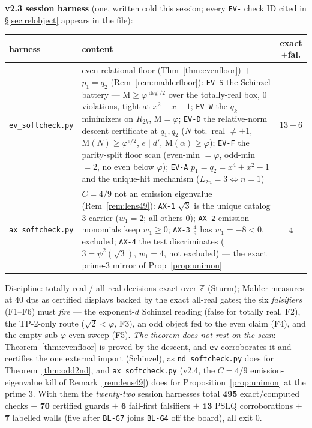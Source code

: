 \documentclass[11pt]{article}
\newcommand{\hx}[1]{\textcolor{cC}{\footnotesize\texttt{#1}}}
\newcommand{\Z}{\mathbb{Z}}
\newcommand{\gp}{\varphi}
\newcommand{\M}{\mathrm{M}}
\theoremstyle{plain}
\theoremstyle{definition}
\theoremstyle{remark}
\begin{document}
\smallskip\noindent
\textbf{v2.3 session harness} (one, written cold this session; every \hx{EV-}
check ID cited in \S\ref{sec:relobject} appears in the file):
\begin{center}\footnotesize\setlength{\tabcolsep}{4pt}
\begin{tabular}{@{}lp{10.4cm}c@{}}
\toprule
harness & content & exact$+$fal.\\
\midrule
\texttt{ev\_softcheck.py} & even relational floor (Thm~\ref{thm:evenfloor}) $+$ $p_1{=}q_2$ (Rem~\ref{rem:mahlerfloor}): \hx{EV-S} the Schinzel battery --- $\M\ge\gp^{\deg/2}$ over the totally-real box, $0$ violations, tight at $x^2-x-1$; \hx{EV-W} the $q_k$ minimizers on $R_{2k}$, $\M=\gp$; \hx{EV-D} the relative-norm descent certificate at $q_1,q_2$ ($N$ tot.\ real $\ne\pm1$, $\M(N)\ge\gp^{e/2}$, $e\mid d'$, $\M(\alpha)\ge\gp$); \hx{EV-F} the parity-split floor scan (even-min $=\gp$, odd-min $=2$, no even below $\gp$); \hx{EV-A} $p_1=q_2=x^4+x^2-1$ and the unique-hit mechanism ($L_{2n}=3\iff n=1$) & $13+6$\\
\texttt{ax\_softcheck.py} & $C{=}4/9$ not an emission eigenvalue (Rem~\ref{rem:lens49}): \hx{AX-1} $\sqrt3$ is the unique catalog $3$-carrier ($w_1{=}2$; all others $0$); \hx{AX-2} emission monomials keep $w_1\ge0$; \hx{AX-3} $\tfrac49$ has $w_1{=}-8<0$, excluded; \hx{AX-4} the test discriminates ($3{=}\psi^2(\sqrt3)$, $w_1{=}4$, not excluded) --- the exact prime-$3$ mirror of Prop~\ref{prop:unimon} & $4$\\
\bottomrule
\end{tabular}
\end{center}
Discipline: totally-real / all-real decisions exact over $\Z$ (Sturm); Mahler
measures at 40 dps as certified displays backed by the exact all-real gates;
the six \emph{falsifiers} (F1--F6) must \emph{fire} --- the exponent-$d$ Schinzel
reading (false for totally real, F2), the TP-2-only route ($\sqrt2<\gp$, F3), an
odd object fed to the even claim (F4), and the empty sub-$\gp$ even sweep (F5).
\emph{The theorem does not rest on the scan}: Theorem~\ref{thm:evenfloor} is proved
by the descent, and \texttt{ev} corroborates it and certifies the one external
import (Schinzel), as \texttt{nd\_softcheck.py} does for
Theorem~\ref{thm:odd2nd}, and \texttt{ax\_softcheck.py} (v2.4, the $C{=}4/9$
emission-eigenvalue kill of Remark~\ref{rem:lens49}) does for
Proposition~\ref{prop:unimon} at the prime $3$. With them the \emph{twenty-two}
session harnesses total $\mathbf{495}$ exact/computed checks $+$ $\mathbf{70}$
certified guards $+$ $\mathbf{6}$ fail-first falsifiers $+$ $\mathbf{13}$ PSLQ
corroborations $+$ $\mathbf{7}$ labelled walls (five after \hx{BL-G7} joins
\hx{BL-G4} off the board), all exit 0.
\end{document}
